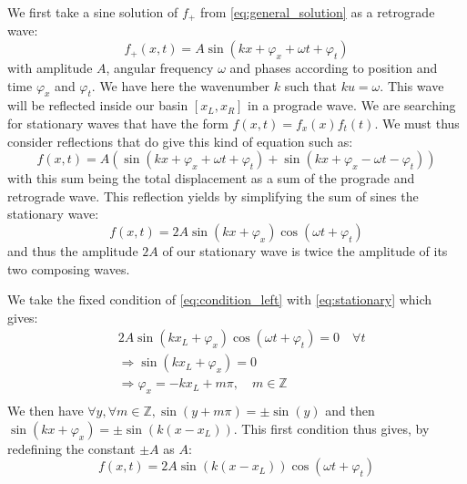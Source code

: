We first take a sine solution of $f_+$ from \autoref{eq:general_solution} as a retrograde wave:
\begin{equation}
    f_+(x,t) = A \sin(kx + \varphi_x + \omega t + \varphi_t)
\end{equation}
with amplitude $A$, angular frequency $\omega$ and phases according to position and time $\varphi_x$ and $\varphi_t$. We have here the wavenumber $k$ such that $ku = \omega$. This wave will be reflected inside our basin $[x_L, x_R]$ in a prograde wave. We are searching for stationary waves that have the form $f(x,t) = f_x(x)f_t(t)$. We must thus consider reflections that do give this kind of equation such as:
\begin{equation}
    f(x,t) = A(\sin(kx + \varphi_x + \omega t + \varphi_t) + \sin(kx + \varphi_x - \omega t - \varphi_t))
\end{equation}
with this sum being the total displacement as a sum of the prograde and retrograde wave. This reflection yields by simplifying the sum of sines the stationary wave:
\begin{equation}
    f(x,t) = 2A\sin(kx + \varphi_x)\cos(\omega t + \varphi_t)
    \label{eq:stationary}
\end{equation}
and thus the amplitude $2A$ of our stationary wave is twice the amplitude of its two composing waves.

We take the fixed condition of \autoref{eq:condition_left} with \autoref{eq:stationary} which gives:
\[
    \begin{aligned}
        & 2A\sin(kx_L + \varphi_x)\cos(\omega t + \varphi_t) = 0 \quad \forall t \\
        & \Rightarrow \sin(kx_L + \varphi_x) = 0 \\
        & \Rightarrow \varphi_x = -kx_L + m\pi, \quad m \in \mathbb{Z}\\
    \end{aligned}    
\]
We then have $\forall y, \forall m \in \mathbb{Z}, \sin(y+m\pi) = \pm \sin(y)$ and then $\sin(kx + \varphi_x) = \pm \sin(k(x-x_L))$. This first condition thus gives, by redefining the constant $\pm A$ as $A$:
\begin{equation}
    f(x,t) = 2A\sin(k(x-x_L))\cos(\omega t + \varphi_t)
    \label{eq:sol_first_condition}
\end{equation}

